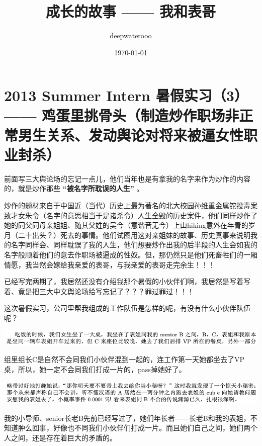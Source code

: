 \documentclass[9pt, b5paper]{article}
\author{deepwaterooo}
\date{\today}
\title{成长的故事 —— 我和表哥}
\begin{document}
\maketitle
\tableofcontents


\section{2013 Summer Intern 暑假实习（3） —— 鸡蛋里挑骨头（制造炒作职场非正常男生关系、发动舆论对将来被逼女性职业封杀）}
\label{sec:org4592701}

前面写三大舆论场的忘记一点儿，他们当年也是有拿我的名字来作为炒作的内容的，就是炒作那些 \textbf{“被名字所耽误的人生”} 。

炒作的题材来自于中国近（当代）历史上最为著名的北大校园孙维重金属铊投毒案致才女朱令（名字的意思相当于是诸杀令）人生全毁的历史案件，他们同样炒作了她的同父同母亲姐姐、随其父姓的吴今（意谐音无今）上山hiking意外在年青的岁月（二十出头？）死去的事情。他们试图用这对亲姐妹的故事、历史真事来说明我的名字同样会、同样耽误了我的人生，他们想要炒作出我的后半段的人生会如我的名字般顺着他们的意去作职场被逼成的性奴。但，那仍然只是他们死畜牲们的一厢情愿，我当然会嫁给我亲爱的表哥，与我亲爱的表哥走完余生！！！

已经写完两期了，我居然还没有介绍我那个暑假的小伙伴们啊，我居然是写着写着、竟是把三大中文舆论场给写忘记了？？？罪过罪过！！！

这次暑假实习，公司里帮我组成的工作队伍是怎样的呢，有没有什么小伙伴队伍呢？

\begin{center}
\includegraphics[width=.9\linewidth]{./pic/backups_plans_20210507_211524.png}
\end{center}

组里组长C是自然不会同我们小伙伴混到一起的，连工作第一天她都坐去了VP桌，所以，她一定不会同我们打成一片的，pass掉她好了。 

\begin{center}
\includegraphics[width=.9\linewidth]{./pic/backups_plans_20210508_165120.png}
\end{center}

我的小导师、senior长老B先前已经写过了，她们年长者——长老B和我的表姐，不知道肿么回事，好像也不同我们小伙伴们打成一片。而且她们自己之间，她们两个人之间，还是存在着巨大的矛盾的。 
\end{document}
